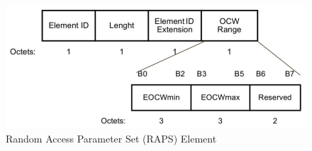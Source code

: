 \begin{figure}[!h]
\centering
\includegraphics[scale=0.4]{./figure/chp2/RAPS.png}
\caption{Random Access Parameter Set (RAPS) Element}
\label{fig_RAPS}
\end{figure}

